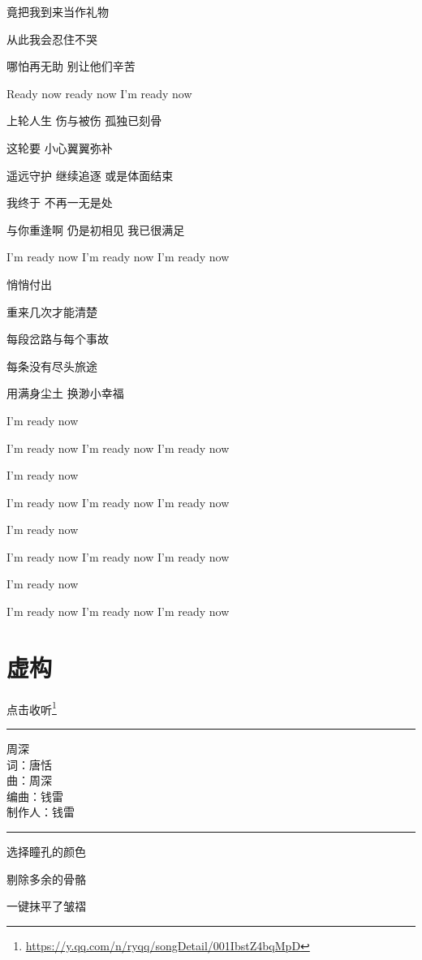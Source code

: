 \documentclass[]{ctexbook}
\renewcommand{\href}[2]{#2\footnote{\url{#1}}}
\begin{document}
竟把我到来当作礼物

从此我会忍住不哭

哪怕再无助 别让他们辛苦

Ready now ready now I'm ready now

上轮人生 伤与被伤 孤独已刻骨

这轮要 小心翼翼弥补

遥远守护 继续追逐 或是体面结束

我终于 不再一无是处

与你重逢啊 仍是初相见 我已很满足

I'm ready now I'm ready now I'm ready now

悄悄付出

重来几次才能清楚

每段岔路与每个事故

每条没有尽头旅途

用满身尘土 换渺小幸福

I'm ready now

I'm ready now I'm ready now I'm ready now

I'm ready now

I'm ready now I'm ready now I'm ready now

I'm ready now

I'm ready now I'm ready now I'm ready now

I'm ready now

I'm ready now I'm ready now I'm ready now

\section*{虚构}\label{the-mask}


\href{https://y.qq.com/n/ryqq/songDetail/001IbstZ4bqMpD}{点击收听}

\begin{center}\rule{0.5\linewidth}{0.5pt}\end{center}

周深\\
词：唐恬\\
曲：周深\\
编曲：钱雷\\
制作人：钱雷

\begin{center}\rule{0.5\linewidth}{0.5pt}\end{center}

选择瞳孔的颜色

剔除多余的骨骼

一键抹平了皱褶
\end{document}
